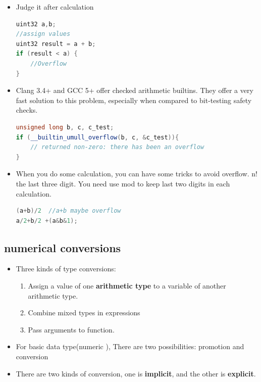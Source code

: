 \documentclass[a4paper,12pt,twoside]{book}
\begin{document}
\begin{itemize}
\begin{lstlisting}[frame=single, language=c++]
if ((x < 0) && (a > INT_MAX + x)) /* `a - x` would overflow */;
if ((x > 0) && (a < INT_MIN + x)) /* `a - x` would underflow */;

if (a > INT_MAX / x) /* `a * x` would overflow */;
if ((a < INT_MIN / x)) /* `a * x` would underflow */;
// need to check for -1 for two's complement machines
if ((a == -1) && (x == INT_MIN)) /* `a * x` overflow */
if ((x == -1) && (a == INT_MIN)) /* `a * x` (or `a / x`) overflow */
\end{lstlisting}

\item Judge it after calculation
\begin{lstlisting}[frame=single, language=c++]
uint32 a,b;
//assign values
uint32 result = a + b;
if (result < a) {
    //Overflow
}
\end{lstlisting}

\item Clang 3.4+ and GCC 5+ offer checked arithmetic builtins. They offer a very fast solution to this problem, especially when compared to bit-testing safety checks.
\begin{lstlisting}[frame=single, language=c++]
unsigned long b, c, c_test;
if (__builtin_umull_overflow(b, c, &c_test)){
    // returned non-zero: there has been an overflow
}
\end{lstlisting}

\item When you do some calculation, you can have some tricks to avoid overflow. n! the last three digit. You need use mod to keep last two digits in each calculation.
\begin{lstlisting}[frame=single, language=c++]
(a+b)/2  //a+b maybe overflow
a/2+b/2 +(a&b&1);
\end{lstlisting}

\end{itemize}


\subsection{numerical conversions}

\begin{itemize}
\item Three kinds of type conversions:
\begin{enumerate}
\item Assign a value of one \textbf{arithmetic type} to a variable of another arithmetic type.
\item Combine mixed types in expressions
\item Pass arguments to function.
\end{enumerate}

\item For basic data type(numeric ), There are two possibilities: promotion and conversion
\item There are two kinds of conversion, one is \textbf{implicit}, and the other is \textbf{explicit}.
\end{itemize}
\end{document}
